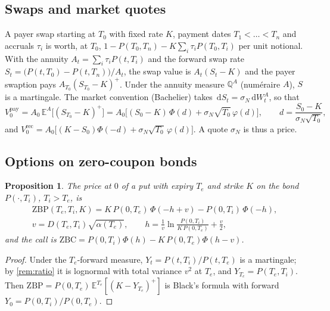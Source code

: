 \documentclass[11pt,a4paper]{article}
\newtheorem{proposition}{Proposition}
\theoremstyle{definition}
\theoremstyle{remark}
\newcommand{\E}{\mathbb{E}}
\newcommand{\Q}{\mathbb{Q}}
\newcommand{\dd}{\,\mathrm{d}}
\begin{document}
\subsection{Swaps and market quotes}
A payer swap starting at $T_0$ with fixed rate $K$, payment dates $T_1<\dots<T_n$ and accruals $\tau_i$ is worth, at $T_0$,
$1-P(T_0,T_n)-K\sum_i\tau_iP(T_0,T_i)$ per unit notional. With the annuity $A_t=\sum_i\tau_iP(t,T_i)$ and the forward
swap rate $S_t=\big(P(t,T_0)-P(t,T_n)\big)/A_t$, the swap value is $A_t(S_t-K)$ and the payer swaption pays
$A_{T_0}(S_{T_0}-K)^+$. Under the annuity measure $\Q^A$ (num\'eraire $A$), $S$ is a martingale. The market convention
(Bachelier) takes $\dd S_t=\sigma_N\dd W^A_t$, so that
\begin{equation}\label{eq:bachelier}
  V^{\mathrm{pay}}_0=A_0\,\E^{A}\big[(S_{T_0}-K)^+\big]=A_0\Big[(S_0-K)\,\Phi(d)+\sigma_N\sqrt{T_0}\,\varphi(d)\Big],\qquad
  d=\frac{S_0-K}{\sigma_N\sqrt{T_0}},
\end{equation}
and $V^{\mathrm{rec}}_0=A_0\big[(K-S_0)\Phi(-d)+\sigma_N\sqrt{T_0}\,\varphi(d)\big]$. A quote $\sigma_N$ is thus a price.

\subsection{Options on zero-coupon bonds}
\begin{proposition}\label{prop:zbo}
The price at $0$ of a put with expiry $T_e$ and strike $K$ on the bond $P(\cdot,T_i)$, $T_i>T_e$, is
\begin{equation}
\begin{gathered}
  \mathrm{ZBP}(T_e,T_i,K)=K\,P(0,T_e)\,\Phi(-h+v)-P(0,T_i)\,\Phi(-h),\\
  v=D(T_e,T_i)\sqrt{\alpha(T_e)},\qquad h=\frac1v\ln\frac{P(0,T_i)}{K\,P(0,T_e)}+\frac v2,
\end{gathered}
\end{equation}
and the call is $\mathrm{ZBC}=P(0,T_i)\Phi(h)-K\,P(0,T_e)\Phi(h-v)$.
\end{proposition}
\begin{proof}
Under the $T_e$-forward measure, $Y_t=P(t,T_i)/P(t,T_e)$ is a martingale; by \cref{rem:ratio} it is lognormal with total
variance $v^2$ at $T_e$, and $Y_{T_e}=P(T_e,T_i)$. Then $\mathrm{ZBP}=P(0,T_e)\,\E^{T_e}[(K-Y_{T_e})^+]$ is Black's formula
with forward $Y_0=P(0,T_i)/P(0,T_e)$.
\end{proof}
\end{document}
